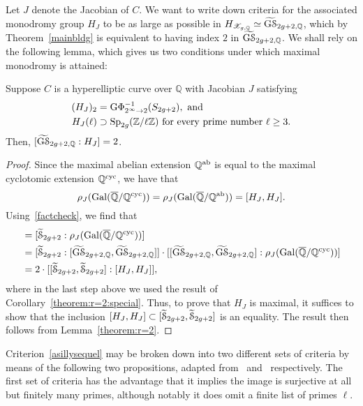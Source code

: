 Let $J$ denote the Jacobian of $C$. We want to write down criteria for the associated monodromy group $H_J$ to be as large as possible in $H_{\mathscr X_{g, \mathbb Q}} \simeq \widetilde{\mathrm{G} \mathcal {S}}_{2{g}+2, \mathbb Q}$, which by Theorem~\ref{mainbldg} is equivalent to having index $2$ in $\widetilde{\mathrm{G} \mathcal {S}}_{2{g}+2, \mathbb Q}$.
We shall rely on the following lemma, which gives us two conditions under which maximal monodromy is attained:
\begin{lemma}
	\label{lemma:reduction-from-adelic-to-mod-l}
	Suppose $C$ is a hyperelliptic curve over $\mathbb Q$ with Jacobian $J$ satisfying
	\begin{align}\label{thethingIwanttocheck}
(H_J)_2 &= \mathrm{G}\Phi_{2^\infty \to 2}^{-1}(S_{2g+2}), \text{ and} \\ 
\label{asillysequel}
H_J(\ell) &\supset \operatorname{Sp}_{2g}(\mathbb Z / \ell \mathbb Z) \text{ for every prime number } \ell \geq 3.
\end{align}
Then, $[\widetilde{\mathrm{G} \mathcal {S}}_{2{g}+2, \mathbb Q} : H_J] = 2$.
\end{lemma}
\begin{proof}
Since the maximal abelian extension $\mathbb Q^{\operatorname{ab}}$ is equal to the maximal cyclotomic extension $\mathbb Q^{\operatorname{cyc}}$, we have that
\begin{equation}\label{factcheck}
\rho_J(\operatorname{Gal}(\overline{\mathbb Q}/\mathbb Q^{\operatorname{cyc}})) = \rho_J(\operatorname{Gal}(\overline{{\mathbb Q}}/{\mathbb Q}^{\operatorname{ab}})) = [H_J , H_J].
\end{equation}
Using~\eqref{factcheck}, we find that
\begin{align*}
[\grouphyp{g}{\QQ} : \mono_J] & = [\hyphat_{2g+2} : \rho_J(\Gal(\ol{\QQ}/\QQ^{\on{cyc}}))] \\
& = [\hyphat_{2g+2} : [\grouphyp{g}{\QQ},\grouphyp{g}{\QQ}]] \cdot [[\grouphyp{g}{\QQ}, \grouphyp{g}{\QQ}] : \rho_J(\Gal(\ol{\bq}/\bq^{\cyc}))] \\
& = 2 \cdot [[\hyphat_{2g+2}, \hyphat_{2g+2}] : [\mono_J, \mono_J]] ,
\end{align*}
where in the last step above we used the result of Corollary~\ref{theorem:r=2:special}. Thus, to prove that $H_J$ is maximal, it suffices to show that the inclusion $[H_J, H_J] \subset [\widetilde{\mathcal{S}}_{2g+2}, \widetilde{\mathcal{S}}_{2g+2}]$ is an equality.
The result then follows from Lemma~\ref{theorem:r=2}.
\end{proof}

Criterion~\eqref{asillysequel} may be broken down into two different sets of criteria by means of the following two propositions, adapted from~\cite{anni2017constructing} and~\cite{seaweed} respectively. The first set of criteria has the advantage that it implies the image is surjective
at all but finitely many primes, 
although notably it does omit a finite list of primes $\ell$.

